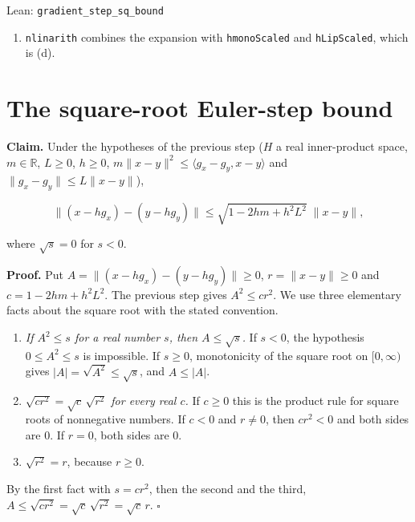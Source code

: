 \documentclass[11pt,a4paper]{article}
\begin{document}
\begin{leanbox}{Lean: \texttt{gradient\_\allowbreak{}step\_\allowbreak{}sq\_\allowbreak{}bound}}
\begin{enumerate}
\item \texttt{nlinarith} combines the expansion with \texttt{hmono\allowbreak{}Scaled} and \texttt{h\allowbreak{}Lip\allowbreak{}Scaled}, which is (d).

\end{enumerate}
\end{leanbox}

\section{\texorpdfstring{The square-root Euler-step bound}{The square-root Euler-step bound}}


\textbf{Claim.} Under the hypotheses of the previous step (\(H\) a real inner-product space, \(m\in\mathbb R\), \(L\ge0\), \(h\ge0\), \(m\|x-y\|^2\le\langle g_x-g_y,x-y\rangle\) and \(\|g_x-g_y\|\le L\|x-y\|\)),


\[\|(x-hg_x)-(y-hg_y)\|\le\sqrt{1-2hm+h^2L^2}\;\|x-y\|,\]


where \(\sqrt s=0\) for \(s<0\).




\textbf{Proof.} Put \(A=\|(x-hg_x)-(y-hg_y)\|\ge0\), \(r=\|x-y\|\ge0\) and \(c=1-2hm+h^2L^2\). The previous step gives \(A^2\le cr^2\). We use three elementary facts about the square root with the stated convention.



\begin{enumerate}


\item \emph{If \(A^2\le s\) for a real number \(s\), then \(A\le\sqrt s\).} If \(s<0\), the hypothesis \(0\le A^2\le s\) is impossible. If \(s\ge0\), monotonicity of the square root on \([0,\infty)\) gives \(|A|=\sqrt{A^2}\le\sqrt s\), and \(A\le|A|\).

\item \emph{\(\sqrt{cr^2}=\sqrt c\,\sqrt{r^2}\) for every real \(c\).} If \(c\ge0\) this is the product rule for square roots of nonnegative numbers. If \(c<0\) and \(r\ne0\), then \(cr^2<0\) and both sides are \(0\). If \(r=0\), both sides are \(0\).

\item \emph{\(\sqrt{r^2}=r\)}, because \(r\ge0\).

\end{enumerate}



By the first fact with \(s=cr^2\), then the second and the third, \(A\le\sqrt{cr^2}=\sqrt c\,\sqrt{r^2}=\sqrt c\,r\). \(\square\)
\end{document}
